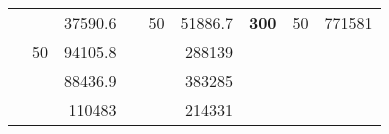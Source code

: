 \begin{table}[H]
\begin{tabular}{|ccrccrccc}
\rowcolor[HTML]{DDFDFF} 
\multicolumn{1}{|c|}{\cellcolor[HTML]{FFFFC7}}                                & \multicolumn{1}{c|}{\cellcolor[HTML]{DDFDFF}}                      & \multicolumn{1}{r|}{\cellcolor[HTML]{DAE8FC}37590.6}   & \multicolumn{1}{c|}{\cellcolor[HTML]{FFFFC7}}                                & \multicolumn{1}{c|}{\multirow{-10}{*}{\cellcolor[HTML]{DDFDFF}50}}  & \multicolumn{1}{r|}{\cellcolor[HTML]{DDFDFF}51886.7}   & \multicolumn{1}{c|}{\multirow{-19}{*}{\cellcolor[HTML]{FFFFC7}\textbf{300}}} & \multicolumn{1}{c|}{\multirow{-10}{*}{\cellcolor[HTML]{DDFDFF}50}} & \multicolumn{1}{r|}{\cellcolor[HTML]{DDFDFF}771581}    \\ \cline{3-3} \cline{5-9} 
\multicolumn{1}{|c|}{\cellcolor[HTML]{FFFFC7}}                                & \multicolumn{1}{c|}{\multirow{-10}{*}{\cellcolor[HTML]{DDFDFF}50}} & \multicolumn{1}{r|}{\cellcolor[HTML]{DDFDFF}94105.8}   & \multicolumn{1}{c|}{\cellcolor[HTML]{FFFFC7}}                                & \multicolumn{1}{c|}{\cellcolor[HTML]{DAE8FC}}                       & \multicolumn{1}{r|}{\cellcolor[HTML]{DAE8FC}288139}    &                                                                              &                                                                    &                                                        \\ \cline{2-3} \cline{6-6}
\multicolumn{1}{|c|}{\cellcolor[HTML]{FFFFC7}}                                & \multicolumn{1}{c|}{\cellcolor[HTML]{DAE8FC}}                      & \multicolumn{1}{r|}{\cellcolor[HTML]{DAE8FC}88436.9}   & \multicolumn{1}{c|}{\cellcolor[HTML]{FFFFC7}}                                & \multicolumn{1}{c|}{\cellcolor[HTML]{DAE8FC}}                       & \multicolumn{1}{r|}{\cellcolor[HTML]{DDFDFF}383285}    &                                                                              &                                                                    &                                                        \\ \cline{3-3} \cline{6-6}
\multicolumn{1}{|c|}{\cellcolor[HTML]{FFFFC7}}                                & \multicolumn{1}{c|}{\cellcolor[HTML]{DAE8FC}}                      & \multicolumn{1}{r|}{\cellcolor[HTML]{DDFDFF}110483}    & \multicolumn{1}{c|}{\cellcolor[HTML]{FFFFC7}}                                & \multicolumn{1}{c|}{\cellcolor[HTML]{DAE8FC}}                       & \multicolumn{1}{r|}{\cellcolor[HTML]{DAE8FC}214331}    &                                                                              &                                                                    &                                                        \\ \cline{3-3} \cline{6-6}

\end{tabular}
\end{table}
